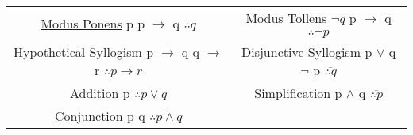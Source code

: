 \documentclass[12pt]{article}
\begin{document}
\begin{center}
\begin{tabular}{ c c }

\makecell{ \underline{Modus Ponens} \\ p \\ p $\rightarrow$ q \\ $\overline{\therefore{q}}$ \\ \quad}

&

\makecell{ \underline{Modus Tollens} \\ $\neg q$ \\ p $\rightarrow$ q \\ $\overline{\therefore{\neg p}}$ \\ \quad}

\\

\makecell{ \underline{Hypothetical Syllogism} \\ p $\rightarrow$ q \\ q $\rightarrow$ r \\ $\overline{\therefore{p \rightarrow r}}$ \\ \quad}

&

\makecell{ \underline{Disjunctive Syllogism} \\ p $\lor$ q \\ $\neg$ p \\ $\overline{\therefore{q}}$ \\ \quad}

\\

\makecell{ \underline{Addition} \\ p \\ $\overline{\therefore{p \lor q}}$ \\ \quad}

&

\makecell{ \underline{Simplification} \\ p $\wedge$ q \\ $\overline{\therefore{p}}$ \\ \quad}

\\

\makecell{ \underline{Conjunction} \\ p \\ q \\ $\overline{\therefore{p \wedge q}}$ \\ \quad }


\end{tabular}
\end{center}
\end{document}
